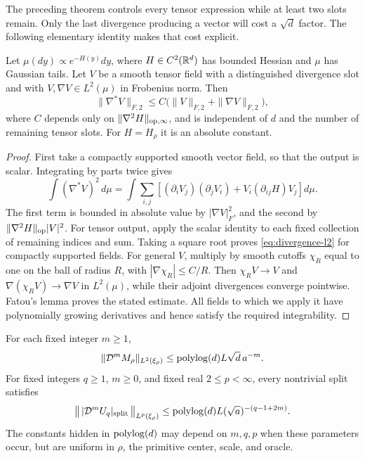 The preceding theorem controls every tensor expression while at least
two slots remain.  Only the last divergence producing a vector will
cost a $\sqrt d$ factor.  The following elementary identity makes
that cost explicit.

\begin{lemma}
\label{lem:divergence-l2}
Let $\mu(dy)\propto e^{-H(y)}dy$, where $H\in C^2(\mathbb R^d)$
has bounded Hessian and $\mu$ has Gaussian tails.  Let $V$ be a smooth
tensor field with a distinguished divergence slot and with
$V,\nabla V\in L^2(\mu)$ in Frobenius norm.  Then
\begin{equation}
 \|\nabla^*V\|_{F,2}
 \le C\bigl(\|V\|_{F,2}+\|\nabla V\|_{F,2}\bigr),
 \label{eq:divergence-l2}
\end{equation}
where $C$ depends only on $\|\nabla^2H\|_{\mathrm{op},\infty}$, and is
independent of $d$ and the number of remaining tensor slots.
For $H=H_\rho$ it is an absolute constant.
\end{lemma}

\begin{proof}
First take a compactly supported smooth vector field, so that the
output is scalar.  Integrating by parts twice gives
\[
 \int(\nabla^*V)^2\,d\mu
 =\int\sum_{i,j}
     \left[(\partial_iV_j)(\partial_jV_i)
                  +V_i(\partial_{ij}H)V_j\right]d\mu.
\]
The first term is bounded in absolute value by $|\nabla V|_F^2$,
and the second by $\|\nabla^2H\|_{\mathrm{op}}|V|^2$.  For tensor output,
apply the scalar identity to each fixed collection of remaining
indices and sum.  Taking a square root proves
\eqref{eq:divergence-l2} for compactly supported fields.  For general
$V$, multiply by smooth cutoffs $\chi_R$ equal to one on the ball of
radius $R$, with $|\nabla\chi_R|\le C/R$.  Then $\chi_RV\to V$
and $\nabla(\chi_RV)\to\nabla V$ in $L^2(\mu)$, while their
adjoint divergences converge pointwise.  Fatou's lemma proves the
stated estimate.  All fields to which we apply it have polynomially
growing derivatives and hence satisfy the required integrability.
\end{proof}

\begin{corollary}
\label{cor:path-derivatives}
For each fixed integer $m\ge1$,
\begin{equation}
 \|\mathcal D^mM_\rho\|_{L^2(\xi_\rho)}
 \le\operatorname{polylog}(d)L\sqrt d\,a^{-m}.
 \label{eq:path-mean}
\end{equation}
For fixed integers $q\ge1$, $m\ge0$, and fixed real
$2\le p<\infty$, every nontrivial split satisfies
\begin{equation}
 \bigl\|\,|\mathcal D^mU_q|_{\mathrm{split}}\,\bigr\|_{L^p(\xi_\rho)}
 \le\operatorname{polylog}(d)L(\sqrt a)^{-(q-1+2m)}.
 \label{eq:path-jet}
\end{equation}
The constants hidden in $\operatorname{polylog}(d)$ may depend on $m,q,p$
when these parameters occur, but are uniform in $\rho$, the primitive
center, scale, and oracle.
\end{corollary}

